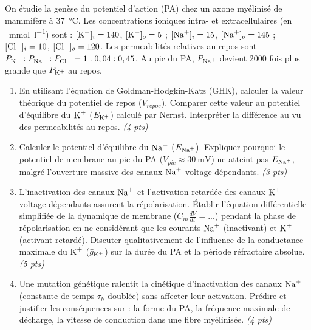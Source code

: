 \documentclass[11pt]{article}
\begin{document}
\begin{exercice}
On étudie la genèse du potentiel d'action (PA) chez un axone myélinisé de mammifère à \SI{37}{\celsius}. Les concentrations ioniques intra- et extracellulaires (en \SI{}{\milli\mole\per\litre}) sont : $[\ce{K+}]_i = 140$, $[\ce{K+}]_o = 5$ ; $[\ce{Na+}]_i = 15$, $[\ce{Na+}]_o = 145$ ; $[\ce{Cl-}]_i = 10$, $[\ce{Cl-}]_o = 120$. Les permeabilités relatives au repos sont $P_{\ce{K+}} : P_{\ce{Na+}} : P_{\ce{Cl-}} = 1 : 0,04 : 0,45$. Au pic du PA, $P_{\ce{Na+}}$ devient 2000 fois plus grande que $P_{\ce{K+}}$ au repos.

\begin{enumerate}
    \item En utilisant l'équation de Goldman-Hodgkin-Katz (GHK), calculer la valeur théorique du potentiel de repos ($V_{repos}$). Comparer cette valeur au potentiel d'équilibre du $\ce{K+}$ ($E_{\ce{K+}}$) calculé par Nernst. Interpréter la différence au vu des permeabilités au repos. \textit{(4 pts)}
    \item Calculer le potentiel d'équilibre du $\ce{Na+}$ ($E_{\ce{Na+}}$). Expliquer pourquoi le potentiel de membrane au pic du PA ($V_{pic} \approx \SI{+30}{\milli\volt}$) ne atteint pas $E_{\ce{Na+}}$, malgré l'ouverture massive des canaux $\ce{Na+}$ voltage-dépendants. \textit{(3 pts)}
    \item L'inactivation des canaux $\ce{Na+}$ et l'activation retardée des canaux $\ce{K+}$ voltage-dépendants assurent la répolarisation. Établir l'équation différentielle simplifiée de la dynamique de membrane ($C_m \frac{dV}{dt} = ...$) pendant la phase de répolarisation en ne considérant que les courants $\ce{Na+}$ (inactivant) et $\ce{K+}$ (activant retardé). Discuter qualitativement de l'influence de la conductance maximale du $\ce{K+}$ ($\bar{g}_{\ce{K+}}$) sur la durée du PA et la période réfractaire absolue. \textit{(5 pts)}
    \item Une mutation génétique ralentit la cinétique d'inactivation des canaux $\ce{Na+}$ (constante de temps $\tau_h$ doublée) sans affecter leur activation. Prédire et justifier les conséquences sur : la forme du PA, la fréquence maximale de décharge, la vitesse de conduction dans une fibre myélinisée. \textit{(4 pts)}
\end{enumerate}
\end{exercice}
\end{document}
